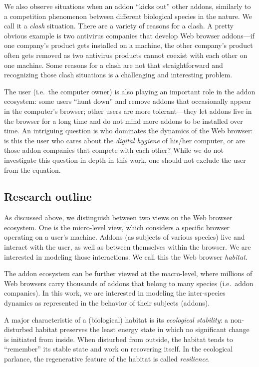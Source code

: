 \documentclass[ijoc,nonblindrev]{informs3} %
\numberwithin{equation}{subsection}
\begin{document}
We also observe situations when an addon ``kicks out'' other addons, similarly to a competition phenomenon between different biological species in the nature. We call it a \emph{clash} situation. There are a variety of reasons for a clash. A pretty obvious example is two antivirus companies that develop Web browser addons---if one company's product gets installed on a machine, the other company's product often gets removed as two antivirus products cannot coexist with each other on one machine. Some reasons for a clash are not that straightforward and recognizing those clash situations is a challenging and interesting problem.

The user (i.e.~the computer owner) is also playing an important role in the addon ecosystem: some users ``hunt down'' and remove addons that occasionally appear in the computer's browser; other users are more tolerant---they let addons live in the browser for a long time and do not mind more addons to be installed over time. An intriguing question is who dominates the dynamics of the Web browser: is this the user who cares about the \emph{digital hygiene} of his/her computer, or are those addon companies that compete with each other? While we do not investigate this question in depth in this work, one should not exclude the user from the equation.

\subsection{Research outline}

As discussed above, we distinguish between two views on the Web browser ecosystem. One is the micro-level view, which considers a specific browser operating on a user's machine. Addons (as subjects of various species) live and interact with the user, as well as between themselves within the browser. We are interested in modeling those interactions. We call this the Web browser \emph{habitat}. 

The addon ecosystem can be further viewed at the macro-level, where millions of Web browsers carry thousands of addons that belong to many species (i.e.~addon companies). In this work, we are interested in modeling the inter-species dynamics as represented in the behavior of their subjects (addons).

A major characteristic of a (biological) habitat is its \emph{ecological stability}: a non-disturbed habitat preserves the least energy state in which no significant change is initiated from inside. When disturbed from outside, the habitat tends to ``remember'' its stable state and work on recovering itself. In the ecological parlance, the regenerative feature of the habitat is called \emph{resilience}. 
\end{document}
